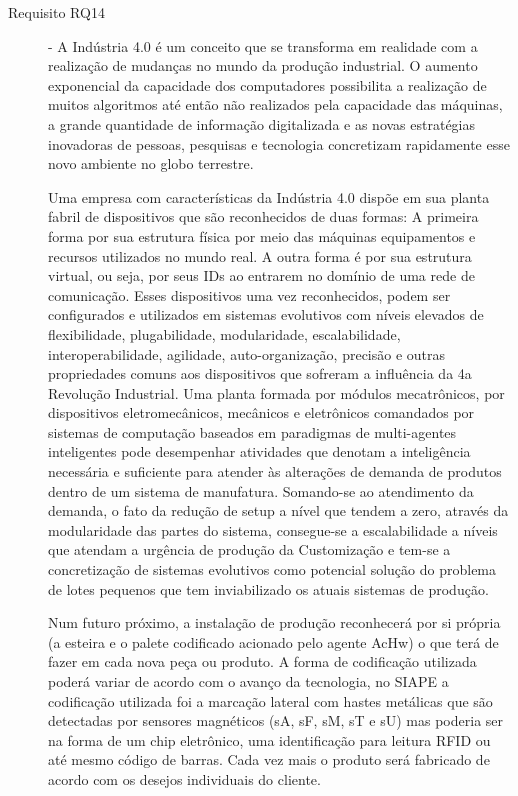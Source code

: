 \documentclass[10pt,letterpaper,twocolumn]{IEEEtran}
\begin{document}
\begin{description}
	\item[Requisito RQ14] - A Indústria 4.0 é um conceito que se transforma em realidade com a realização de mudanças no mundo da produção industrial. O aumento exponencial da capacidade dos computadores possibilita a realização de muitos algoritmos até então não realizados pela capacidade das máquinas, a grande quantidade de informação digitalizada e as novas estratégias inovadoras de pessoas, pesquisas e tecnologia concretizam rapidamente esse novo ambiente no globo terrestre.\par 	
	Uma empresa com características da Indústria 4.0 dispõe em sua planta fabril de dispositivos que são reconhecidos de duas formas: A primeira forma por sua estrutura física por meio das máquinas equipamentos e recursos utilizados no mundo real. A outra forma é por sua estrutura virtual, ou seja,  por seus IDs ao entrarem no domínio de uma rede de comunicação. Esses dispositivos uma vez reconhecidos, podem ser configurados e utilizados em sistemas evolutivos com níveis elevados de flexibilidade, plugabilidade, modularidade, escalabilidade, interoperabilidade, agilidade, auto-organização, precisão e outras propriedades comuns aos dispositivos que sofreram a influência da 4a Revolução Industrial. Uma planta formada por módulos mecatrônicos, por dispositivos eletromecânicos, mecânicos e eletrônicos comandados por sistemas de computação baseados em paradigmas de multi-agentes inteligentes pode desempenhar atividades que denotam a inteligência necessária e suficiente para atender às alterações de demanda de produtos dentro de um sistema de manufatura. Somando-se ao atendimento da demanda, o fato da redução de setup a nível que tendem a zero, através da modularidade das partes do sistema, consegue-se a escalabilidade a níveis que atendam a urgência de produção da Customização e tem-se a concretização de sistemas evolutivos como potencial solução do problema de lotes pequenos que tem inviabilizado os atuais sistemas de produção. \par
	
	Num futuro próximo, a instalação de produção reconhecerá por si própria (a esteira e o palete codificado acionado pelo agente AcHw) o que terá de fazer em cada nova peça ou produto. A forma de codificação utilizada poderá variar de acordo com o avanço da tecnologia, no SIAPE a codificação utilizada foi a marcação lateral com hastes metálicas que são detectadas por sensores magnéticos (sA, sF, sM, sT e sU) mas poderia ser na forma de um chip eletrônico, uma identificação para leitura RFID ou até mesmo código de barras. Cada vez mais o produto será fabricado de acordo com os desejos individuais do cliente.
	

\end{description}
\end{document}
